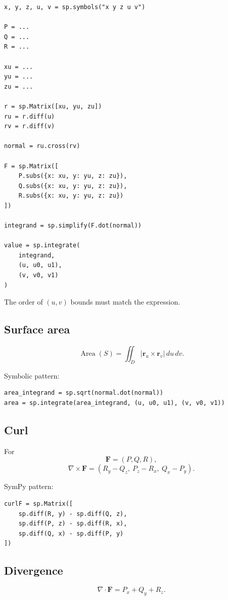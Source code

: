 \begin{verbatim}
x, y, z, u, v = sp.symbols("x y z u v")

P = ...
Q = ...
R = ...

xu = ...
yu = ...
zu = ...

r = sp.Matrix([xu, yu, zu])
ru = r.diff(u)
rv = r.diff(v)

normal = ru.cross(rv)

F = sp.Matrix([
    P.subs({x: xu, y: yu, z: zu}),
    Q.subs({x: xu, y: yu, z: zu}),
    R.subs({x: xu, y: yu, z: zu})
])

integrand = sp.simplify(F.dot(normal))

value = sp.integrate(
    integrand,
    (u, u0, u1),
    (v, v0, v1)
)
\end{verbatim}

The order of \((u,v)\) bounds must match the expression.

\subsection*{Surface area}

\[
\boxed{
    \operatorname{Area}(S)
    =
    \iint_D
    |\mathbf r_u\times\mathbf r_v|
    \,du\,dv.
}
\]

Symbolic pattern:

\begin{verbatim}
area_integrand = sp.sqrt(normal.dot(normal))
area = sp.integrate(area_integrand, (u, u0, u1), (v, v0, v1))
\end{verbatim}

\subsection*{Curl}

For
\[
    \mathbf F=(P,Q,R),
\]
\[
\boxed{
    \nabla\times\mathbf F
    =
    (R_y-Q_z,\ P_z-R_x,\ Q_x-P_y).
}
\]

SymPy pattern:

\begin{verbatim}
curlF = sp.Matrix([
    sp.diff(R, y) - sp.diff(Q, z),
    sp.diff(P, z) - sp.diff(R, x),
    sp.diff(Q, x) - sp.diff(P, y)
])
\end{verbatim}

\subsection*{Divergence}

\[
\boxed{
    \nabla\cdot\mathbf F=P_x+Q_y+R_z.
}
\]


